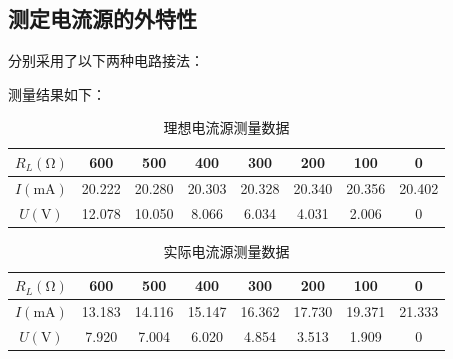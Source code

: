 \documentclass[a4paper,utf8]{article}
\begin{document}
    \subsection{测定电流源的外特性}
        分别采用了以下两种电路接法：\par
        \begin{figure}[!ht]
            \hspace{5mm}
        \end{figure}\par
        测量结果如下：\par
        \begin{table}[!ht]
            \centering\begin{tabular}{c c c c c c c c}\toprule
                $R_L (\unit{\ohm})$ & 600 & 500 & 400 & 300 & 200 & 100 & 0 \\ \midrule
                $I (\unit{\mA})$ & 20.222 & 20.280 & 20.303 & 20.328 & 20.340 & 20.356 & 20.402 \\
                $U (\unit{\V})$ & 12.078 & 10.050 & 8.066 & 6.034 & 4.031 & 2.006 & 0 \\ \bottomrule
            \end{tabular}\caption{理想电流源测量数据}
        \end{table}\par
        \begin{table}[!ht]
            \centering\begin{tabular}{c c c c c c c c}\toprule
                $R_L (\unit{\ohm})$ & 600 & 500 & 400 & 300 & 200 & 100 & 0 \\ \midrule
                $I (\unit{\mA})$ & 13.183 & 14.116 & 15.147 & 16.362 & 17.730 & 19.371 & 21.333 \\
                $U (\unit{\V})$ & 7.920 & 7.004 & 6.020 & 4.854 & 3.513 & 1.909 & 0 \\ \bottomrule
            \end{tabular}\caption{实际电流源测量数据}
        \end{table}\par
\end{document}

